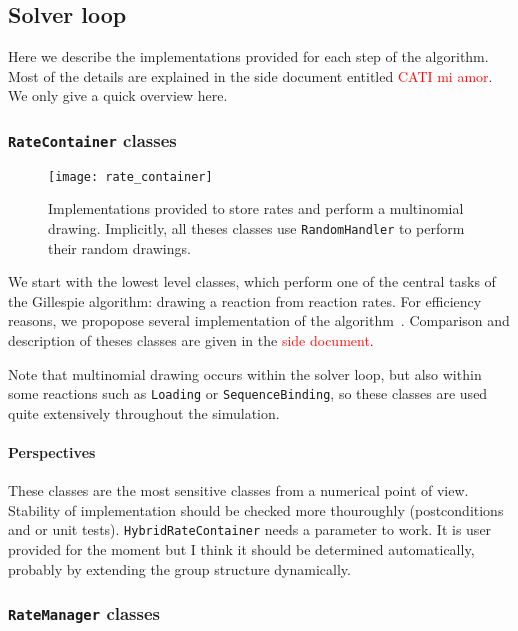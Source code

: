 \subsection{Solver loop}

Here we describe the implementations provided for each step of the algorithm. Most of the details are explained in the side document entitled \textcolor{red}{CATI mi amor}. We only give a quick overview here.

\subsubsection{\texttt{RateContainer} classes}

\begin{figure}[!h]
  \centering
  \texttt{[image: rate\_container]}
  \caption{Implementations provided to store rates and perform a multinomial drawing. Implicitly, all theses classes use \texttt{RandomHandler} to perform their random drawings. }
  \label{fig:rate_container}
\end{figure}

We start with the lowest level classes, which perform one of the central tasks of the Gillespie algorithm: drawing a reaction from reaction rates. For efficiency reasons, we propopose several implementation of the algorithm~. Comparison and description of theses classes are given in the \textcolor{red}{side document}. 

Note that multinomial drawing occurs within the solver loop, but also within some reactions such as \texttt{Loading} or \texttt{SequenceBinding}, so these classes are used quite extensively throughout the simulation.

\paragraph{Perspectives} These classes are the most sensitive classes from a numerical point of view. Stability of implementation should be checked more thouroughly (postconditions and or unit tests). \texttt{HybridRateContainer} needs a parameter to work. It is user provided for the moment but I think it should be determined automatically, probably by extending the group structure dynamically.

\subsubsection{\texttt{RateManager} classes}

